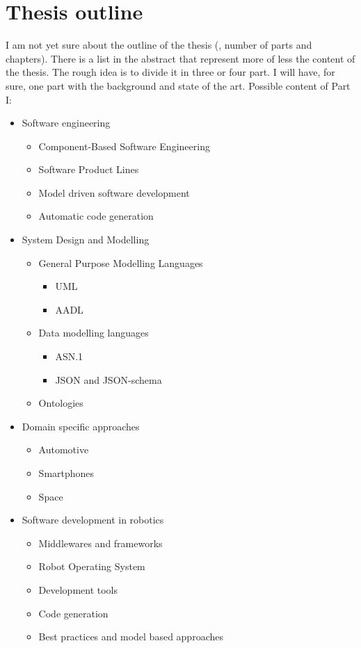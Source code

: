 \section{Thesis outline}
I am not yet sure about the outline of the thesis (\ie, number of parts and chapters). There is a list in the abstract that represent more of less the content of the thesis. The rough idea is to divide it in three or four part. I will have, for sure, one part with the background and state of the art. Possible content of Part I:
\begin{itemize}
\item Software engineering
	\begin{itemize}
	\item Component-Based Software Engineering
	\item Software Product Lines
	\item Model driven software development
	\item Automatic code generation
	\end{itemize}
\item System Design and Modelling
	\begin{itemize}
	\item General Purpose Modelling Languages
		\begin{itemize}
		\item UML
		\item AADL
		\end{itemize}
	\item Data modelling languages
		\begin{itemize}
		\item ASN.1
		\item JSON and JSON-schema
		\end{itemize}
        	\item Ontologies
	\end{itemize}
\item Domain specific approaches
	\begin{itemize}
	\item Automotive
	\item Smartphones
	\item Space
	\end{itemize}
\item Software development in robotics
	\begin{itemize}
	\item Middlewares and frameworks
	\item Robot Operating System
	\item Development tools
	\item Code generation
	\item Best practices and model based approaches
	\end{itemize}
\end{itemize} 











